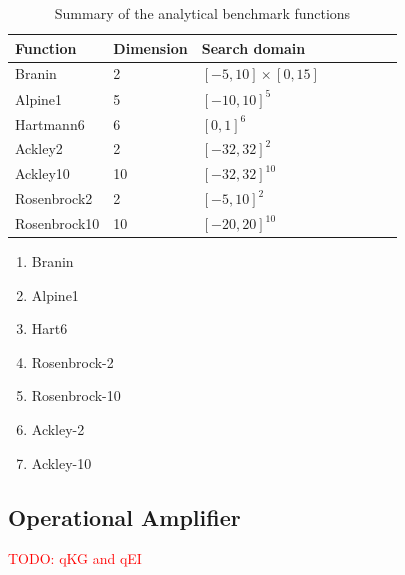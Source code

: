 \begin{table}[htbp]
    \centering
    \caption{Summary of the analytical benchmark functions}
    \label{tab:summaryanalygical}
    \begin{tabular}{llllllll}
        \toprule
        Function            & Dimension        & Search domain    \\ \midrule
         Branin             & 2                & $[-5, 10]\times[0, 15]$ \\
         Alpine1            & 5                & $[-10, 10]^5$           \\
         Hartmann6          & 6                & $[0, 1]^6$              \\
         Ackley2            & 2                & $[-32, 32]^2$           \\
         Ackley10           & 10               & $[-32, 32]^{10}$          \\
         Rosenbrock2        & 2                & $[-5, 10]^2$            \\
         Rosenbrock10       & 10               & $[-20, 20]^{10}$          \\
        \bottomrule
    \end{tabular}
\end{table}

\begin{enumerate}
        \item Branin
        \item Alpine1
        \item Hart6
        \item Rosenbrock-2
        \item Rosenbrock-10
        \item Ackley-2
        \item Ackley-10
\end{enumerate}

\subsection{Operational Amplifier}

\textcolor{red}{TODO: qKG and qEI}

